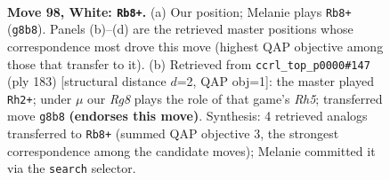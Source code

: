 \documentclass[11pt]{article}
\begin{document}
\begin{figure}[p]\centering
\begin{subfigure}{0.46\textwidth}\centering
\resizebox{\linewidth}{!}{%
\newchessgame
\chessboard[
  setfen={6R1/8/1k6/8/7r/r7/5K2/8 w - - 6 98},
  showmover=false,
  pgfstyle=straightmove, color=movearrow, markmove={g8-b8}
]}
\caption{}
\end{subfigure}\hfill
\begin{subfigure}{0.46\textwidth}\centering
\resizebox{\linewidth}{!}{%
\newchessgame
\chessboard[
  setfen={1k6/8/8/8/7r/2R5/4K3/8 b - - 15 92},
  showmover=false,
  pgfstyle=straightmove, color=movearrow, markmove={h4-h2}
]}
\caption{}
\end{subfigure}
\\[4pt]

\caption{\textbf{Move 98, White: \texttt{Rb8+}.} (a) Our position; Melanie plays \texttt{Rb8+} (\texttt{g8b8}). Panels (b)--(d) are the retrieved master positions whose correspondence most drove this move (highest QAP objective among those that transfer to it). (b) Retrieved from \texttt{ccrl\_top\_p0000\#147} (ply 183) [structural distance $d$=2, QAP obj=1]: the master played \texttt{Rh2+}; under $\mu$ our \emph{Rg8} plays the role of that game's \emph{Rh5}; transferred move \texttt{g8b8} \textbf{(endorses this move)}. Synthesis: 4 retrieved analogs transferred to \texttt{Rb8+} (summed QAP objective 3, the strongest correspondence among the candidate moves); Melanie committed it via the \texttt{search} selector.}
\label{fig:thought-m194}
\end{figure}

\clearpage
\end{document}
